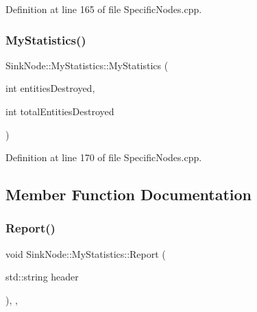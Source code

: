 Definition at line 165 of file Specific\+Nodes.\+cpp.

\mbox{\label{class_sink_node_1_1_my_statistics_af8352a16e20eab800737612436be103e}} 
\subsubsection{\texorpdfstring{My\+Statistics()}{MyStatistics()}\hspace{0.1cm}{\footnotesize\ttfamily [2/2]}}
{\footnotesize\ttfamily Sink\+Node\+::\+My\+Statistics\+::\+My\+Statistics (\begin{DoxyParamCaption}\item[{int}]{entities\+Destroyed,  }\item[{int}]{total\+Entities\+Destroyed }\end{DoxyParamCaption})\hspace{0.3cm}{\ttfamily [inline]}}



Definition at line 170 of file Specific\+Nodes.\+cpp.



\subsection{Member Function Documentation}
\mbox{\label{class_sink_node_1_1_my_statistics_acd304ae3a9892c9de454dc7ee36a942b}} 
\subsubsection{\texorpdfstring{Report()}{Report()}}
{\footnotesize\ttfamily void Sink\+Node\+::\+My\+Statistics\+::\+Report (\begin{DoxyParamCaption}\item[{std\+::string}]{header }\end{DoxyParamCaption})\hspace{0.3cm}{\ttfamily [inline]}, {\ttfamily [override]}, {\ttfamily [virtual]}}



